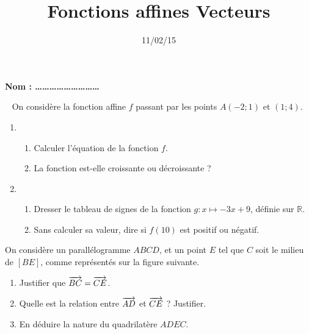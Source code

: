 \documentclass[12pt]{article}
\title{\large Fonctions affines Vecteurs}
\date{11/02/15}
\begin{document}
\textbf{\Large Nom : \ldots\ldots\ldots\ldots\ldots\ldots\ldots\ldots\ldots}
\vspace{.5cm}

\maketitle

\begin{exercice}~
  On considère la fonction affine $f$ passant par les points $A\left( -2;1 \right)$ et $\left( 1;4 \right)$.
  \begin{enumerate}
    \item 
      \begin{enumerate}
        \item Calculer l'équation de la fonction $f$.
        \item La fonction est-elle croissante ou décroissante ?
      \end{enumerate}
    \item 
      \begin{enumerate}
        \item Dresser le tableau de signes de la fonction $g:x\mapsto -3x+9$, définie sur $\mathbb{R}$.
        \item Sans calculer sa valeur, dire si $f(10)$ est positif ou négatif.
      \end{enumerate}
  \end{enumerate}
\end{exercice}

\begin{exercice}
  On considère un parallélogramme $ABCD$, et un point $E$ tel que $C$ soit le
  milieu de $\left[ BE \right]$, comme représentés sur la figure suivante.

  \begin{center}
  \end{center}
  \begin{enumerate}
    \item Justifier que $\overrightarrow{BC}=\overrightarrow{CE}$.
    \item Quelle est la relation entre $\overrightarrow{AD}$ et $\overrightarrow{CE}$ ? Justifier.
    \item En déduire la nature du quadrilatère $ADEC$.
  \end{enumerate}
\end{exercice}
\end{document}
